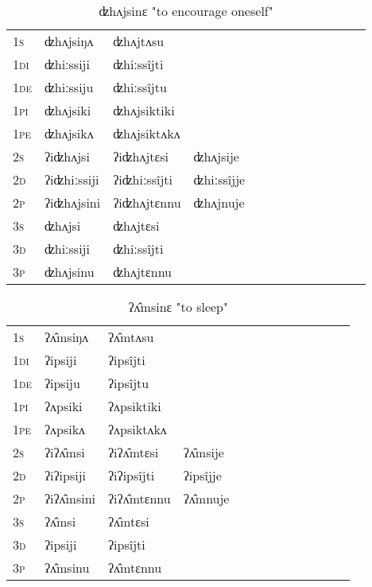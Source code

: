 \documentclass[oldfontcommands,oneside,a4paper,11pt]{article}
\begin{document}
\begin{table}[H]
\label{in.vr} \centering 
\caption{ʣhʌjsinɛ  "to encourage oneself"  }
\begin{tabular}{l|l|l|l|l|l|l|l|l|l|l|l|l}  \toprule
\textsc{1s} &ʣhʌjsiŋʌ &ʣhʌjtʌsu \\ 
\textsc{1di} &ʣhiːssiji &ʣhiːssîjti   \\
\textsc{1de} &ʣhiːssiju &ʣhiːssîjtu   \\ 
\textsc{1pi} &ʣhʌjsiki &ʣhʌjsiktiki   \\ 
\textsc{1pe} &ʣhʌjsikʌ &ʣhʌjsiktʌkʌ   \\ 
\textsc{2s} & ʔiʣhʌjsi & ʔiʣhʌjtɛsi &ʣhʌjsije  \\ 
\textsc{2d} & ʔiʣhiːssiji & ʔiʣhiːssîjti &ʣhiːssîjje    \\
\textsc{2p} & ʔiʣhʌjsini  & ʔiʣhʌjtɛnnu &ʣhʌjnuje  \\ 
\textsc{3s} & ʣhʌjsi & ʣhʌjtɛsi   \\ 
\textsc{3d} & ʣhiːssiji & ʣhiːssîjti   \\ 
\textsc{3p} & ʣhʌjsinu  & ʣhʌjtɛnnu \\ 
\bottomrule
\end{tabular}
\end{table}


\begin{table}[H]
\label{ip.vr} \centering 
\caption{ʔʌ̂msinɛ  "to sleep"  }
\begin{tabular}{l|l|l|l|l|l|l|l|l|l|l|l|l}  \toprule
\textsc{1s} &ʔʌ̂msiŋʌ &ʔʌ̂mtʌsu \\ 
\textsc{1di} &ʔipsiji &ʔipsîjti   \\
\textsc{1de} &ʔipsiju &ʔipsîjtu   \\ 
\textsc{1pi} &ʔʌpsiki &ʔʌpsiktiki   \\ 
\textsc{1pe} &ʔʌpsikʌ &ʔʌpsiktʌkʌ   \\ 
\textsc{2s} & ʔiʔʌ̂msi & ʔiʔʌ̂mtɛsi &ʔʌ̂msije  \\ 
\textsc{2d} & ʔiʔipsiji & ʔiʔipsîjti &ʔipsîjje    \\
\textsc{2p} & ʔiʔʌ̂msini  & ʔiʔʌ̂mtɛnnu &ʔʌ̂mnuje  \\ 
\textsc{3s} & ʔʌ̂msi & ʔʌ̂mtɛsi   \\ 
\textsc{3d} & ʔipsiji & ʔipsîjti   \\ 
\textsc{3p} & ʔʌ̂msinu  & ʔʌ̂mtɛnnu \\ 
\bottomrule
\end{tabular}
\end{table}
\end{document}
